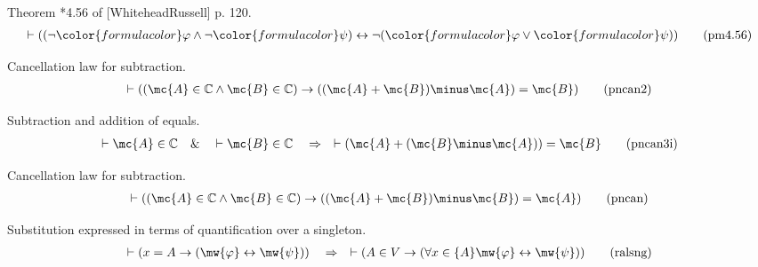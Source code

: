 \begin{lemma} {Theorem *4.56 of [WhiteheadRussell]} p. 120. 
\begin{align}
\vdash ( ( \lnot {\color{formulacolor}\varphi} \wedge \lnot
    {\color{formulacolor}\psi} ) \leftrightarrow \lnot (
    {\color{formulacolor}\varphi} \vee {\color{formulacolor}\psi} )
    )\label{eq:pm4.56}\tag{pm4.56}
\end{align}
\end{lemma}


\begin{lemma} {Cancellation law for subtraction.} 
\begin{align}
\vdash ( ( \mc{A} \in \mathbb{C} \wedge \mc{B} \in \mathbb{C} ) \rightarrow ( (
    \mc{A} + \mc{B} ) \minus \mc{A} ) = \mc{B} )\label{eq:pncan2}\tag{pncan2}
\end{align}
\end{lemma}


\begin{lemma} {Subtraction and addition of equals.} 
\begin{align}
\vdash \mc{A} \in \mathbb{C}\quad\&\quad \vdash \mc{B} \in
    \mathbb{C}\quad\Rightarrow\quad \vdash ( \mc{A} + ( \mc{B} \minus \mc{A} ) ) =
    \mc{B}\label{eq:pncan3i}\tag{pncan3i}
\end{align}
\end{lemma}


\begin{lemma} {Cancellation law for subtraction.} 
\begin{align}
\vdash ( ( \mc{A} \in \mathbb{C} \wedge \mc{B} \in \mathbb{C} ) \rightarrow ( (
    \mc{A} + \mc{B} ) \minus \mc{B} ) = \mc{A} )\label{eq:pncan}\tag{pncan}
\end{align}
\end{lemma}


\begin{lemma} {Substitution expressed in terms of
quantification over a singleton.}
\begin{align}
\vdash ( x = A \rightarrow ( \mw{\varphi} \leftrightarrow \mw{\psi} )
    )\quad\Rightarrow\quad \vdash ( A \in V \rightarrow ( \forall x \in \{ A \}
    \mw{\varphi} \leftrightarrow \mw{\psi} ) )\label{eq:ralsng}\tag{ralsng}
\end{align}
\end{lemma}


